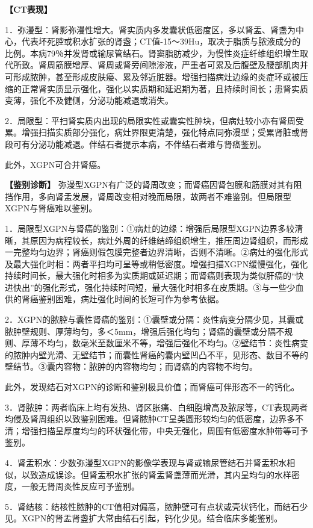 \textbf{【CT表现】}

1．弥漫型：肾影弥漫性增大。肾实质内多发囊状低密度区，多以肾盂、肾盏为中心，代表坏死腔或积水扩张的肾盏；CT值-15～39Hu，取决于脂质与脓液成分的比例。本病79％并发肾或输尿管结石。肾窦脂肪减少，为慢性炎症纤维组织增生取代所致。肾周筋膜增厚、肾周或肾旁间隙渗液，严重者可累及后腹壁及腰部肌肉并可形成脓肿，甚至形成皮肤瘘、累及邻近脏器。增强扫描病灶边缘的炎症环或被压缩的正常肾实质显示强化，强化以实质期和延迟期为著，且持续时间长；患肾实质变薄，强化不及健侧，分泌功能减退或消失。

2．局限型：平扫肾实质内出现的局限实性或囊实性肿块，但病灶较小亦有肾周受累。增强扫描实质部分强化，病灶界限更清楚，强化特点同弥漫型；受累肾脏或肾段可有分泌功能减退。伴结石者提示本病，不伴结石者难与肾癌鉴别。

此外，XGPN可合并肾癌。

\textbf{【鉴别诊断】}
弥漫型XGPN有广泛的肾周改变；而肾癌因肾包膜和筋膜对其有阻挡作用，多向肾盂发展，肾周改变相对晚而局限，故两者不难鉴别。但局限型XGPN与肾癌难以鉴别。

1．局限型XGPN与肾癌的鉴别：①病灶的边缘：增强后局限型XGPN边界多较清晰，其原因为病程较长，病灶外周的纤维结缔组织增生，推压周边肾组织，而形成一完整均匀边界；肾癌则假包膜完整者边界清晰，否则不清晰。②病灶的强化形式及最大强化时相：两者平扫均可呈等或稍低密度。增强扫描XGPN缓慢强化，强化持续时间长，最大强化时相多为实质期或延迟期；而肾癌则表现为类似肝癌的“快进快出”的强化形式，强化持续时间短，最大强化时相多在皮质期。③与一些少血供的肾癌鉴别困难，病灶强化时间的长短可作为参考依据。

2．XGPN的脓腔与囊性肾癌的鉴别：①囊壁或分隔：炎性病变分隔少见，其囊或脓肿壁规则、厚薄均匀，多＜5mm，增强后强化均匀；肾癌的囊壁或分隔不规则、厚薄不均匀，数毫米至数厘米不等，增强后强化不均匀。②壁结节：炎性病变的脓肿内壁光滑、无壁结节；而囊性肾癌的囊内壁凹凸不平，见形态、数目不等的壁结节。③囊内容物：脓肿的内容物均匀；而肾癌的内容物不均匀。

此外，发现结石对XGPN的诊断和鉴别极具价值；而肾癌可伴形态不一的钙化。

3．肾脓肿：两者临床上均有发热、肾区胀痛、白细胞增高及脓尿等，CT表现两者均侵及肾周组织以致鉴别困难。但肾脓肿CT呈类圆形较均匀的低密度，边界多不清；增强扫描呈厚度均匀的环状强化带，中央无强化，周围有低密度水肿带等可予鉴别。

4．肾盂积水：少数弥漫型XGPN的影像学表现与肾或输尿管结石并肾盂积水相似，以致造成误诊。但肾盂积水扩张的肾盂肾盏薄而光滑，其内呈均匀的水样密度，一般无肾周炎性反应可予鉴别。

5．肾结核：结核性脓肿的CT值相对偏高，脓肿壁可有点状或壳状钙化，而结石少见。XGPN的肾盂肾盏扩大常由结石引起，钙化少见。结合临床多能鉴别。

